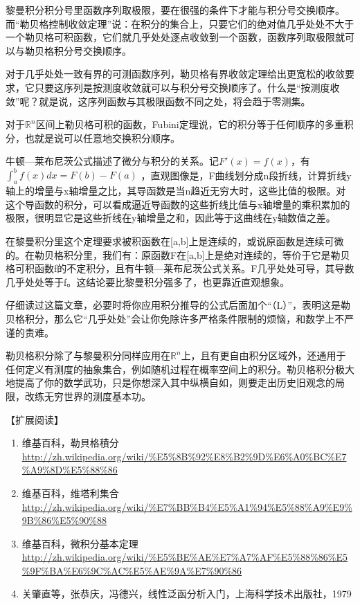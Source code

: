 黎曼积分积分号里函数序列取极限，要在很强的条件下才能与积分号交换顺序。而``勒贝格控制收敛定理''说：在积分的集合上，只要它们的绝对值几乎处处不大于一个勒贝格可积函数，它们就几乎处处逐点收敛到一个函数，函数序列取极限就可以与勒贝格积分号交换顺序。

对于几乎处处一致有界的可测函数序列，勒贝格有界收敛定理给出更宽松的收敛要求，它只要这序列是按测度收敛就可以与积分号交换顺序了。什么是``按测度收敛''呢？就是说，这序列函数与其极限函数不同之处，将会趋于零测集。

对于$ \mathbb{R}^n $区间上勒贝格可积的函数，Fubini定理说，它的积分等于任何顺序的多重积分，也就是说可以任意地交换积分顺序。

牛顿—莱布尼茨公式描述了微分与积分的关系。记$ F'(x)=f(x) $，有 $ \int_a^b f(x)dx = F(b)-F(a) $ ，直观图像是，F曲线划分成n段折线，计算折线y轴上的增量与x轴增量之比，其导函数是当n趋近无穷大时，这些比值的极限。对这个导函数的积分，可以看成逼近导函数的这些折线比值与x轴增量的乘积累加的极限，很明显它是这些折线在y轴增量之和，因此等于这曲线在y轴数值之差。

在黎曼积分里这个定理要求被积函数在[a,b]上是连续的，或说原函数是连续可微的。在勒贝格积分里，我们有：原函数F在[a,b]上是绝对连续的，等价于它是勒贝格可积函数f的不定积分，且有牛顿—莱布尼茨公式关系。F几乎处处可导，其导数几乎处处等于f。这结论要比黎曼积分强多了，也更靠近直观想象。

仔细读过这篇文章，必要时将你应用积分推导的公式后面加个``（L）''，表明这是勒贝格积分，那么它``几乎处处''会让你免除许多严格条件限制的烦恼，和数学上不严谨的责难。

勒贝格积分除了与黎曼积分同样应用在$ \mathbb{R}^n $上，且有更自由积分区域外，还通用于任何定义有测度的抽象集合，例如随机过程在概率空间上的积分。勒贝格积分极大地提高了你的数学武功，只是你想深入其中纵横自如，则要走出历史旧观念的局限，改练无穷世界的测度基本功。


【扩展阅读】

\begin{enumerate}
	\item 维基百科，勒貝格積分
	\url{http://zh.wikipedia.org/wiki/\%E5\%8B\%92\%E8\%B2\%9D\%E6\%A0\%BC\%E7\%A9\%8D\%E5\%88\%86}
	
	\item 维基百科，维塔利集合\url{http://zh.wikipedia.org/wiki/\%E7\%BB\%B4\%E5\%A1\%94\%E5\%88\%A9\%E9\%9B\%86\%E5\%90\%88}
	
	\item 维基百科，微积分基本定理\url{http://zh.wikipedia.org/wiki/\%E5\%BE\%AE\%E7\%A7\%AF\%E5\%88\%86\%E5\%9F\%BA\%E6\%9C\%AC\%E5\%AE\%9A\%E7\%90\%86}
	
	\item 关肇直等，张恭庆，冯德兴，线性泛函分析入门，上海科学技术出版社，1979
\end{enumerate}

